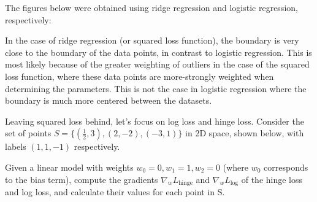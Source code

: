 \begin{solution}
  The figures below were obtained using ridge regression and logistic regression, respectively:
  \begin{figure}[H]
  \end{figure}
  In the case of ridge regression (or squared loss function), the boundary is very close to the boundary of the data points, in contrast to logistic regression. This is most likely because of the greater weighting of outliers in the case of the squared loss function, where these data points are more-strongly weighted when determining the parameters. This is not the case in logistic regression where the boundary is much more centered between the datasets.
\end{solution}

\problem[9]
Leaving squared loss behind, let's focus on log loss and hinge loss. Consider the set of points $S = \{(\frac{1}{2}, 3), (2, -2), (-3, 1)\}$ in 2D space, shown below, with labels $(1, 1, -1)$ respectively.

Given a linear model with weights $w_0 = 0, w_1 = 1, w_2 = 0$ (where $w_0$ corresponds to the bias term), compute the gradients $\nabla_{w}L_{\text{hinge}}$ and $\nabla_{w}L_{\text{log}}$ of the hinge loss and log loss, and calculate their values for each point in S.

